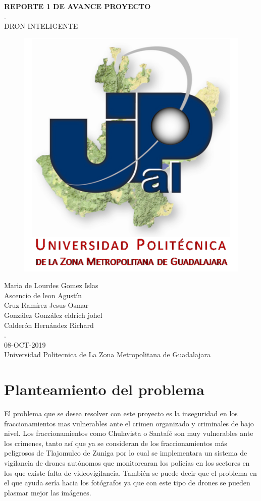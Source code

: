 \documentclass[11pt,a4paper]{article}
\begin{document}
\begin{center}
\textbf{REPORTE 1 DE AVANCE PROYECTO}\\
.\\
DRON INTELIGENTE
\end{center}

\begin{figure}[h]
\centering
\includegraphics[scale=1]{upzmg}
\end{figure}

\begin{center}
Maria de Lourdes Gomez Islas\\
Ascencio de leon Agustín\\
Cruz Ramírez Jesus Osmar\\
González González eldrich johel\\
Calderón Hernández Richard\\
.\\
08-OCT-2019\\
Universidad Politecnica de La Zona Metropolitana de Guadalajara
\end{center}

\newpage 

\part{Planteamiento del problema}
El problema que se desea resolver con este proyecto es la inseguridad en los fraccionamientos mas vulnerables ante el crimen organizado y criminales de bajo nivel.
Los fraccionamientos como Chulavista o Santafé son muy vulnerables ante los crimenes, tanto así que ya se consideran de los fraccionamientos más peligrosos de Tlajomulco de Zuniga por lo cual se implementara un sistema de vigilancia de drones autónomos que monitorearan los policías en los  sectores en los que existe  falta de videovigilancia.
También se puede decir que el problema en el que ayuda sería hacia los fotógrafos ya que con este tipo de drones se pueden plasmar mejor las imágenes.
\end{document}
